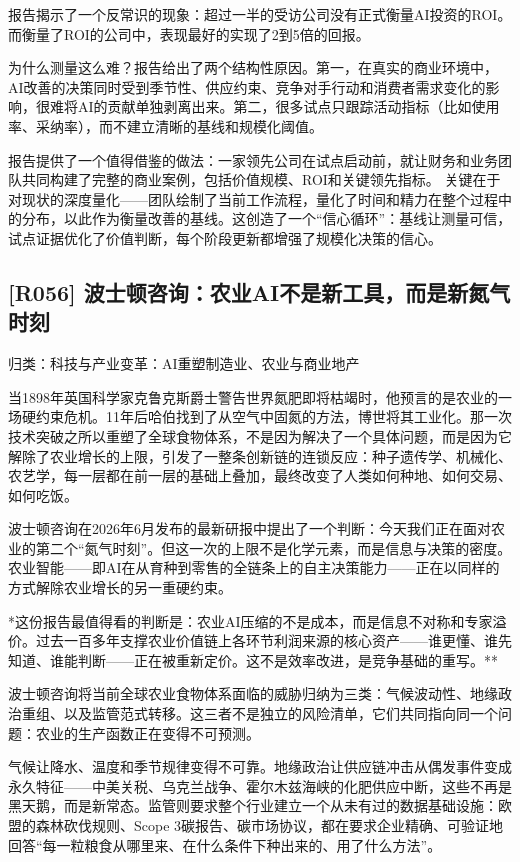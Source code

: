 \documentclass[11pt]{ctexart}
\begin{document}
报告揭示了一个反常识的现象：超过一半的受访公司没有正式衡量AI投资的ROI。 而衡量了ROI的公司中，表现最好的实现了2到5倍的回报。

为什么测量这么难？报告给出了两个结构性原因。第一，在真实的商业环境中，AI改善的决策同时受到季节性、供应约束、竞争对手行动和消费者需求变化的影响，很难将AI的贡献单独剥离出来。第二，很多试点只跟踪活动指标（比如使用率、采纳率），而不建立清晰的基线和规模化阈值。

报告提供了一个值得借鉴的做法：一家领先公司在试点启动前，就让财务和业务团队共同构建了完整的商业案例，包括价值规模、ROI和关键领先指标。 关键在于对现状的深度量化——团队绘制了当前工作流程，量化了时间和精力在整个过程中的分布，以此作为衡量改善的基线。这创造了一个“信心循环”：基线让测量可信，试点证据优化了价值判断，每个阶段更新都增强了规模化决策的信心。

\subsection{[R056] 波士顿咨询：农业AI不是新工具，而是新氮气时刻}
{\small\color{refgray}归类：科技与产业变革：AI重塑制造业、农业与商业地产}

当1898年英国科学家克鲁克斯爵士警告世界氮肥即将枯竭时，他预言的是农业的一场硬约束危机。11年后哈伯找到了从空气中固氮的方法，博世将其工业化。那一次技术突破之所以重塑了全球食物体系，不是因为解决了一个具体问题，而是因为它解除了农业增长的上限，引发了一整条创新链的连锁反应：种子遗传学、机械化、农艺学，每一层都在前一层的基础上叠加，最终改变了人类如何种地、如何交易、如何吃饭。

波士顿咨询在2026年6月发布的最新研报中提出了一个判断：今天我们正在面对农业的第二个“氮气时刻”。但这一次的上限不是化学元素，而是信息与决策的密度。农业智能——即AI在从育种到零售的全链条上的自主决策能力——正在以同样的方式解除农业增长的另一重硬约束。

*这份报告最值得看的判断是：农业AI压缩的不是成本，而是信息不对称和专家溢价。过去一百多年支撑农业价值链上各环节利润来源的核心资产——谁更懂、谁先知道、谁能判断——正在被重新定价。这不是效率改进，是竞争基础的重写。**

波士顿咨询将当前全球农业食物体系面临的威胁归纳为三类：气候波动性、地缘政治重组、以及监管范式转移。这三者不是独立的风险清单，它们共同指向同一个问题：农业的生产函数正在变得不可预测。

气候让降水、温度和季节规律变得不可靠。地缘政治让供应链冲击从偶发事件变成永久特征——中美关税、乌克兰战争、霍尔木兹海峡的化肥供应中断，这些不再是黑天鹅，而是新常态。监管则要求整个行业建立一个从未有过的数据基础设施：欧盟的森林砍伐规则、Scope 3碳报告、碳市场协议，都在要求企业精确、可验证地回答“每一粒粮食从哪里来、在什么条件下种出来的、用了什么方法”。
\end{document}
